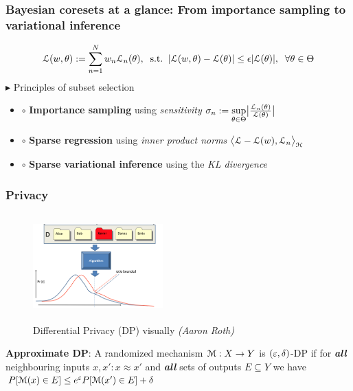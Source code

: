 \documentclass[hyperref={colorlinks = true},unknownkeysallowed]{beamer}
\let\oldcitep=\citep
\renewcommand\citep[1]{\hypersetup{linkcolor=darkred}\hyperlink{#1}{\oldcitep{#1}}}
\begin{document}
\begin{frame}
	\frametitle{Bayesian coresets at a glance: From importance sampling to variational inference}
	\begin{align*}
	\mathcal{L}(w, \theta):=\sum_{n=1}^{N} w_n \mathcal{L}_n(\theta), \;\;\text{s.t.}\;\; |\mathcal{L}(w, \theta) - \mathcal{L}(\theta)| \leq \epsilon |\mathcal{L}(\theta)|, \;\;\forall \theta \in \Theta
	\end{align*}
	$\blacktriangleright$ Principles of subset selection
	\begin{itemize}
		\item $\circ$ \textbf{Importance sampling} using \emph{sensitivity} $\sigma_n := \underset{\theta \in \Theta}{\sup}\big|\frac{\mathcal{L}_n(\theta)}{\mathcal{L}(\theta)}\big|$~\citep{huggins16}
		\item $\circ$ \textbf{Sparse regression} using \emph{inner product norms} $ \big\langle \mathcal{L} - \mathcal{L}(w), \mathcal{L}_n \big\rangle_{\mathcal{H}}$~\citep{campbell19jmlr}
		\item $\circ$ \textbf{Sparse variational inference} using the \emph{KL divergence} ~\citep{campbell19neurips}
	\end{itemize}
\end{frame}	

\begin{frame}
		\frametitle{Privacy}
		\begin{figure}
			\centering 
			\includegraphics[width=5cm,height=4cm]{figs/dp.png}
			\caption{Differential Privacy (DP) visually \emph{(\textsuperscript{\textcopyright}Aaron Roth)}}
		\end{figure}
	\textbf{Approximate DP}: A randomized mechanism $\mathcal{M} : X \rightarrow Y$ is $(\varepsilon, \delta)$-DP if for \emph{\textbf{all}} neighbouring inputs $x, x': x \approx x'$ and \emph{\textbf{all}} sets of outputs $E \subseteq Y$ we have 
	$P[\mathcal{M}(x) \in E] \leq e^\varepsilon P[\mathcal{M}(x') \in E] + \delta$
\end{frame}
\end{document}
